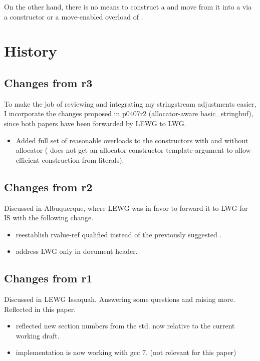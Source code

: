 \documentclass[ebook,11pt,article]{memoir}
\begin{document}
On the other hand, there is no means to construct a  and move from it into a  via a constructor or a move-enabled overload of .

\section{History}

\subsection{Changes from r3}
To make the job of reviewing and integrating my stringstream adjustments easier, I incorporate the changes proposed in p0407r2 (allocator-aware basic\_stringbuf), since both papers have been forwarded by LEWG to LWG.
\begin{itemize}
\item Added full set of reasonable overloads to the constructors with and without allocator ( does not get an allocator constructor template argument to allow efficient construction from  literals).
\end{itemize}


\subsection{Changes from r2}
Discussed in Albuquerque, where LEWG was in favor to forward it to LWG for IS with the following change.
\begin{itemize}
\item reestablish rvalue-ref qualified  instead of the previously suggested .
\item address LWG only in document header.
\end{itemize}


\subsection{Changes from r1}
Discussed in LEWG Issaquah. Answering some questions and raising more. Reflected in this paper.
\begin{itemize}
\item reflected new section numbers from the std. now relative to the current working draft.
\item implementation is now working with gcc 7. (not relevant for this paper)
\end{itemize}
\end{document}
